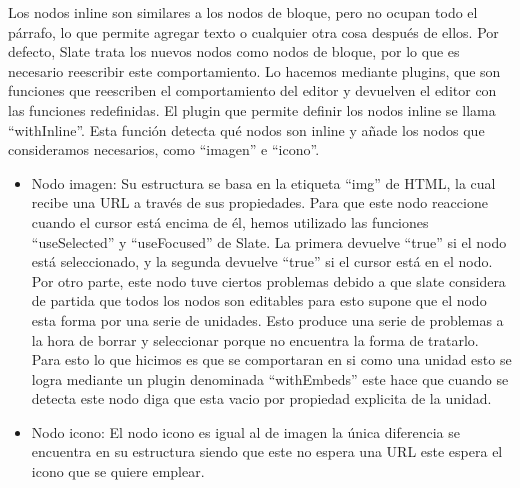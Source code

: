 Los nodos inline son similares a los nodos de bloque, pero no ocupan todo el párrafo, lo que permite agregar texto o cualquier otra cosa después de ellos. Por defecto, Slate trata los nuevos nodos como nodos de bloque, por lo que es necesario reescribir este comportamiento. Lo hacemos mediante plugins, que son funciones que reescriben el comportamiento del editor y devuelven el editor con las funciones redefinidas. El plugin que permite definir los nodos inline se llama ``withInline''. Esta función detecta qué nodos son inline y añade los nodos que consideramos necesarios, como ``imagen'' e ``icono''.
\begin{itemize}
  \item Nodo imagen: Su estructura se basa en la etiqueta ``img'' de HTML, la cual recibe una URL a través de sus propiedades. Para que este nodo reaccione cuando el cursor está encima de él, hemos utilizado las funciones ``useSelected'' y ``useFocused'' de Slate. La primera devuelve ``true'' si el nodo está seleccionado, y la segunda devuelve ``true'' si el cursor está en el nodo. Por otro parte, este nodo tuve ciertos problemas debido a que slate considera de partida que todos los nodos son editables para esto supone que el nodo esta forma por una serie de unidades. Esto produce una serie de problemas a la hora de borrar y seleccionar porque no encuentra la forma de tratarlo. Para esto lo que hicimos es que se comportaran en si como una unidad esto se logra mediante un plugin denominada ``withEmbeds'' este hace que cuando se detecta este nodo diga que esta vacio por
        propiedad explicita de la unidad.
  \item Nodo icono: El nodo icono es igual al de imagen la única diferencia se encuentra en su estructura siendo que este no espera una URL este espera el icono que se quiere emplear.
\end{itemize}

